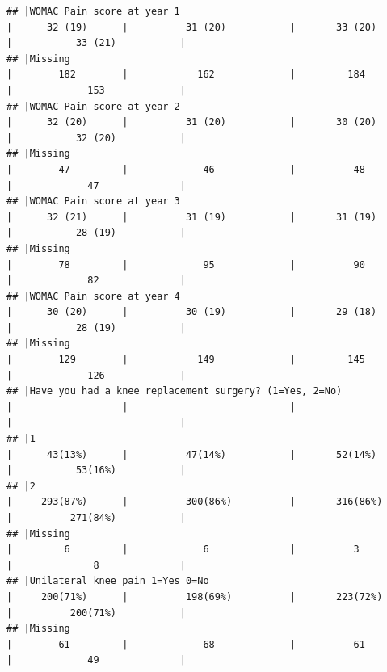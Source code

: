 \documentclass{article}
\begin{document}
\begin{verbatim}
## |WOMAC Pain score at year 1                                                     |      32 (19)      |          31 (20)           |       33 (20)        |           33 (21)           |
## |Missing                                                                        |        182        |            162             |         184          |             153             |
## |WOMAC Pain score at year 2                                                     |      32 (20)      |          31 (20)           |       30 (20)        |           32 (20)           |
## |Missing                                                                        |        47         |             46             |          48          |             47              |
## |WOMAC Pain score at year 3                                                     |      32 (21)      |          31 (19)           |       31 (19)        |           28 (19)           |
## |Missing                                                                        |        78         |             95             |          90          |             82              |
## |WOMAC Pain score at year 4                                                     |      30 (20)      |          30 (19)           |       29 (18)        |           28 (19)           |
## |Missing                                                                        |        129        |            149             |         145          |             126             |
## |Have you had a knee replacement surgery? (1=Yes, 2=No)                         |                   |                            |                      |                             |
## |1                                                                              |      43(13%)      |          47(14%)           |       52(14%)        |           53(16%)           |
## |2                                                                              |     293(87%)      |          300(86%)          |       316(86%)       |          271(84%)           |
## |Missing                                                                        |         6         |             6              |          3           |              8              |
## |Unilateral knee pain 1=Yes 0=No                                                |     200(71%)      |          198(69%)          |       223(72%)       |          200(71%)           |
## |Missing                                                                        |        61         |             68             |          61          |             49              |

\end{verbatim}
\end{document}
